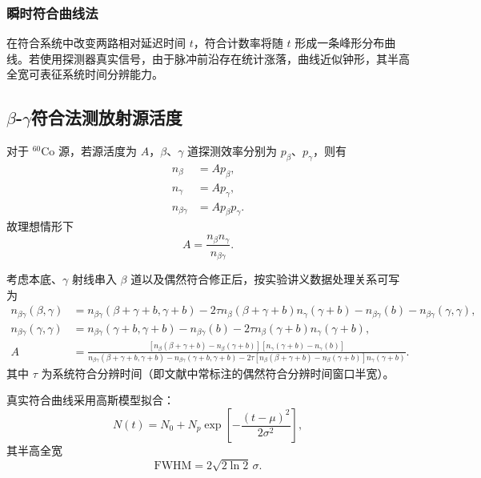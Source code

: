 \documentclass[12pt,a4paper]{article}
\begin{document}
\subsubsection{瞬时符合曲线法}
在符合系统中改变两路相对延迟时间 $t$，符合计数率将随 $t$ 形成一条峰形分布曲线。若使用探测器真实信号，由于脉冲前沿存在统计涨落，曲线近似钟形，其半高全宽可表征系统时间分辨能力。

\subsection{$\beta$-$\gamma$符合法测放射源活度}
对于 $^{60}\mathrm{Co}$ 源，若源活度为 $A$，$\beta$、$\gamma$ 道探测效率分别为 $p_{\beta}$、$p_{\gamma}$，则有
\begin{align}
    n_{\beta} &= A p_{\beta}, \\
    n_{\gamma} &= A p_{\gamma}, \\
    n_{\beta\gamma} &= A p_{\beta} p_{\gamma}.
\end{align}
故理想情形下
\begin{equation}
    A = \frac{n_{\beta} n_{\gamma}}{n_{\beta\gamma}}.
\end{equation}

考虑本底、$\gamma$ 射线串入 $\beta$ 道以及偶然符合修正后，按实验讲义数据处理关系可写为
\begin{equation}
\begin{aligned}
n_{\beta\gamma}(\beta,\gamma) &= n_{\beta\gamma}(\beta+\gamma+b, \gamma+b)-2\tau n_{\beta}(\beta+\gamma+b)n_{\gamma}(\gamma+b)-n_{\beta\gamma}(b)-n_{\beta\gamma}(\gamma,\gamma), \\
n_{\beta\gamma}(\gamma,\gamma) &= n_{\beta\gamma}(\gamma+b, \gamma+b)-n_{\beta\gamma}(b)-2\tau n_{\beta}(\gamma+b)n_{\gamma}(\gamma+b), \\
A &= \frac{\left[n_{\beta}(\beta+\gamma+b)-n_{\beta}(\gamma+b)\right]\left[n_{\gamma}(\gamma+b)-n_{\gamma}(b)\right]}{n_{\beta\gamma}(\beta+\gamma+b, \gamma+b)-n_{\beta\gamma}(\gamma+b, \gamma+b)-2\tau\left[n_{\beta}(\beta+\gamma+b)-n_{\beta}(\gamma+b)\right]n_{\gamma}(\gamma+b)}.
\end{aligned}
\label{eq:A}
\end{equation}
其中 $\tau$ 为系统符合分辨时间（即文献中常标注的偶然符合分辨时间窗口半宽）。

真实符合曲线采用高斯模型拟合：
\begin{equation}
    N(t)=N_0+N_p\exp\!\left[-\frac{{(t-\mu)}^2}{2\sigma^2}\right],
\end{equation}
其半高全宽
\begin{equation}
    \mathrm{FWHM}=2\sqrt{2\ln 2}\,\sigma.
\end{equation}
\end{document}
